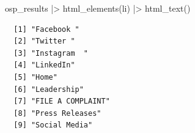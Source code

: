 \documentclass[
  letterpaper,
  DIV=11,
  numbers=noendperiod]{scrreprt}
\newenvironment{Shaded}{\begin{snugshade}}{\end{snugshade}}
\newcommand{\FunctionTok}[1]{\textcolor[rgb]{0.28,0.35,0.67}{#1}}
\newcommand{\NormalTok}[1]{\textcolor[rgb]{0.00,0.23,0.31}{#1}}
\newcommand{\SpecialCharTok}[1]{\textcolor[rgb]{0.37,0.37,0.37}{#1}}
\newcommand{\StringTok}[1]{\textcolor[rgb]{0.13,0.47,0.30}{#1}}
\begin{document}
\begin{Shaded}
\begin{Highlighting}[]
\NormalTok{osp\_results }\SpecialCharTok{|\textgreater{}} \FunctionTok{html\_elements}\NormalTok{(}\StringTok{\textquotesingle{}li\textquotesingle{}}\NormalTok{) }\SpecialCharTok{|\textgreater{}} \FunctionTok{html\_text}\NormalTok{()}
\end{Highlighting}
\end{Shaded}

\begin{verbatim}
  [1] "Facebook "                                                                                                                                                                                                                                           
  [2] "Twitter "                                                                                                                                                                                                                                            
  [3] "Instagram  "                                                                                                                                                                                                                                         
  [4] "LinkedIn"                                                                                                                                                                                                                                            
  [5] "Home"                                                                                                                                                                                                                                                
  [6] "Leadership"                                                                                                                                                                                                                                          
  [7] "FILE A COMPLAINT"                                                                                                                                                                                                                                    
  [8] "Press Releases"                                                                                                                                                                                                                                      
  [9] "Social Media"                                                                                                                                                                                                                                        

\end{verbatim}
\end{document}
